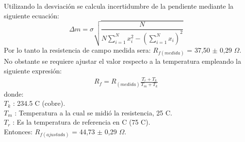 \documentclass[11pt,letterpaper]{article}     %
\begin{document}
Utilizando la desviación se calcula incertidumbre de la pendiente mediante la siguiente ecuación:
\begin{equation}
	\Delta m = \sigma \sqrt{\frac{N}{N\sum_{i=1}^{N}x_{i}^{2}-\left(\sum_{i=1}^{N}x_{i}\right)^{2}}} \label{incertiPendiente}
\end{equation}
Por lo tanto la resistencia de campo medida sera: $R_{f(medida)}$ = 37,50 $\pm$ 0,29 $\Omega$. No obstante se requiere ajustar el valor respecto a la temperatura empleando la siguiente expresión:
\begin{align}
	R_{f} = R_{(medida)} \frac{T_{r}+T_{k}}{T_{m}+T_{k}} \label{ajusteTemp}
\end{align}
donde:\\
$T_{k}$ : 234.5 \textdegree C (cobre).\\
$T_{m}$ : Temperatura a la cual se midió la resistencia, 25 \textdegree C.\\
$T_{r}$ : Es la temperatura de referencia en \textdegree C (75 \textdegree C).\\
Entonces: $R_{f(ajustada)}$ = 44,73 $\pm$ 0,29 $\Omega$.
\end{document}

